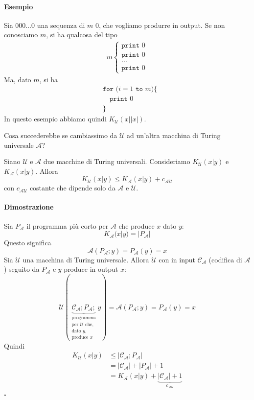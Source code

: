 \paragraph{Esempio} Sia $000\dots0$ una sequenza di $m$ 0, che vogliamo produrre in output. Se non conosciamo $m$, si ha qualcosa del tipo
\begin{align*}
    m\begin{cases}
        \texttt{print }0\\
        \texttt{print }0\\
        \dots\\
        \texttt{print }0
    \end{cases}
\end{align*}
Ma, dato $m$, si ha
\begin{align*}
    &\texttt{for (}i=1\texttt{ to }m\texttt{)\{}\\
    &\quad \texttt{print }0\\
    &\texttt{\}}
\end{align*}
In questo esempio abbiamo quindi $K_\mathcal{U}(x||x|)$.\bigskip 

Cosa succederebbe se cambiassimo da $\mathcal{U}$ ad un'altra macchina di Turing universale $\mathcal{A}$?
\begin{theorem}
    Siano $\mathcal{U}$ e $\mathcal{A}$ due macchine di Turing universali. Consideriamo $K_\mathcal{U}(x|y)$ e $K_\mathcal{A}(x|y)$. Allora 
    $$
        K_\mathcal{U}(x|y) \leq K_\mathcal{A}(x|y) + c_{\mathcal{A}\mathcal{U}}
    $$
    con $c_{\mathcal{A}\mathcal{U}}$ costante che dipende solo da $\mathcal{A}$ e $\mathcal{U}$.
\end{theorem}
\paragraph{Dimostrazione} Sia $P_\mathcal{A}$ il programma più corto per $\mathcal{A}$ che produce $x$ dato $y$:
$$
    K_\mathcal{A}(x|y) = |P_\mathcal{A}|
$$
Questo significa
$$
    \mathcal{A}(P_\mathcal{A};y) = P_\mathcal{A}(y) = x
$$
Sia $\mathcal{U}$ una macchina di Turing universale. Allora $\mathcal{U}$ con in input $\mathcal{C}_\mathcal{A}$ (codifica di $\mathcal{A}$) seguito da $P_\mathcal{A}$ e $y$ produce in output $x$:
$$
    \mathcal{U}(\underbrace{\mathcal{C}_\mathcal{A};P_\mathcal{A};}_{\substack{\text{programma}\\\text{per $\mathcal{U}$ che,}\\\text{dato $y$,}\\\text{produce $x$}}}y) = \mathcal{A}(P_\mathcal{A};y) = P_\mathcal{A}(y) = x
$$
Quindi
\begin{align*}
    K_\mathcal{U}(x|y) &\leq |\mathcal{C}_\mathcal{A};P_\mathcal{A}|\\
    &= |\mathcal{C}_\mathcal{A}| + |P_\mathcal{A}| + 1\\
    &= K_\mathcal{A}(x|y) + \underbrace{|\mathcal{C}_\mathcal{A}| + 1}_{c_{\mathcal{A}\mathcal{U}}}
\end{align*}
\hfill $\square$

